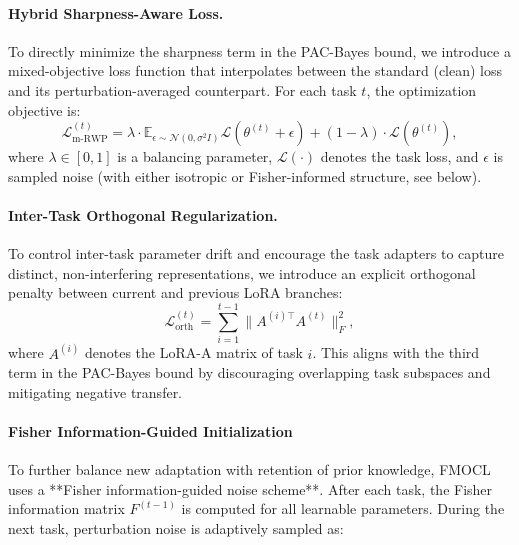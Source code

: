 \documentclass[letterpaper]{article} %
\begin{document}

\paragraph{Hybrid Sharpness-Aware Loss.}
To directly minimize the sharpness term in the PAC-Bayes bound, we introduce a mixed-objective loss function that interpolates between the standard (clean) loss and its perturbation-averaged counterpart. For each task $t$, the optimization objective is:
\begin{equation}
\label{eq:mrwp-loss}
\mathcal{L}_{\mathrm{m\text{-}RWP}}^{(t)} = \lambda \cdot \mathbb{E}_{\epsilon \sim \mathcal{N}(0, \sigma^2 I)} \mathcal{L}(\theta^{(t)} + \epsilon) + (1 - \lambda) \cdot \mathcal{L}(\theta^{(t)}),
\end{equation}
where $\lambda \in [0,1]$ is a balancing parameter, $\mathcal{L}(\cdot)$ denotes the task loss, and $\epsilon$ is sampled noise (with either isotropic or Fisher-informed structure, see below).

\paragraph{Inter-Task Orthogonal Regularization.}
To control inter-task parameter drift and encourage the task adapters to capture distinct, non-interfering representations, we introduce an explicit orthogonal penalty between current and previous LoRA branches:
\begin{equation}
\label{eq:orth_loss}
\mathcal{L}_{\text{orth}}^{(t)} = \sum_{i=1}^{t-1} \|A^{(i)\top} A^{(t)}\|_F^2,
\end{equation}
where $A^{(i)}$ denotes the LoRA-A matrix of task $i$. This aligns with the third term in the PAC-Bayes bound by discouraging overlapping task subspaces and mitigating negative transfer.

\paragraph{ Fisher Information-Guided Initialization}
To further balance new adaptation with retention of prior knowledge, FMOCL uses a **Fisher information-guided noise scheme**. After each task, the Fisher information matrix $F^{(t-1)}$ is computed for all learnable parameters. During the next task, perturbation noise is adaptively sampled as:
\end{document}
